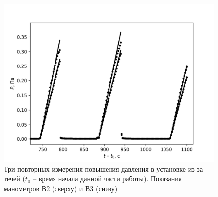 \documentclass[14pt, a4paper]{report}
\begin{document}
\begin{figure}[!ht]
\centering
\includegraphics[scale=0.7]{terma5_6.png}
\caption{Три повторных измерения повышения давления в установке из-за течей ($t_0$ -- время начала данной части работы). Показания манометров В2 (сверху) и В3 (снизу)}
\end{figure}
\end{document}
